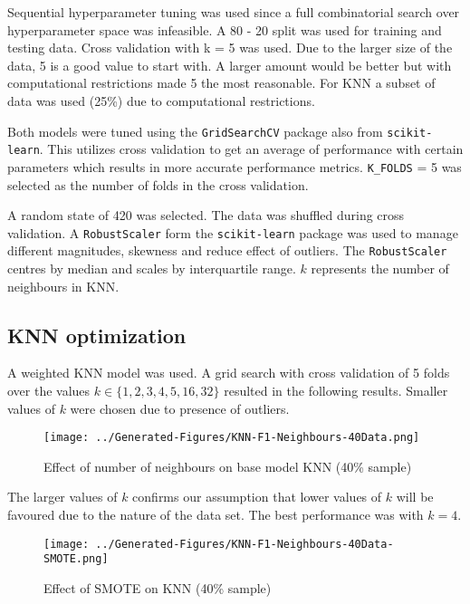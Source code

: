 \documentclass[conference]{IEEEtran}
\begin{document}
Sequential hyperparameter tuning was used since a full combinatorial search over hyperparameter space was infeasible. A 80 - 20 split was used for training and testing data. Cross validation with k = 5 was used. Due to the larger size of the data, 5 is a good value to start with. A larger amount would be better but with computational restrictions made 5 the most reasonable. For KNN a subset of data was used (25\%) due to computational restrictions.

Both models were tuned using the \texttt{GridSearchCV} package also from \texttt{scikit-learn}. This utilizes cross validation to get an average of performance with certain parameters which results in more accurate performance metrics. \texttt{K\_FOLDS} = 5 was selected as the number of folds in the cross validation. 

A random state of 420 was selected. The data was shuffled during cross validation. A \texttt{RobustScaler} form the \texttt{scikit-learn} package was used to manage different magnitudes, skewness and reduce effect of outliers. The \texttt{RobustScaler} centres by median and scales by interquartile range. $k$ represents the number of neighbours in KNN.
\subsection{KNN optimization}
A weighted KNN model was used. A grid search with cross validation of 5 folds over the values $k \in \{1, 2, 3, 4, 5, 16, 32\}$ resulted in the following results. Smaller values of $k$ were chosen due to presence of outliers. 
\begin{figure}[H]
	\centering
	\begin{minipage}{0.45\textwidth}
		\centering
		\texttt{[image: ../Generated-Figures/KNN-F1-Neighbours-40Data.png]}
		\caption{Effect of number of neighbours on base model KNN (40\% sample)}
		\label{fig:neighbours}
	\end{minipage}
\end{figure}

The larger values of $k$ confirms our assumption that lower values of $k$ will be favoured due to the nature of the data set. The best performance was with $k=4$.

\begin{figure}[H]
	\centering
	\begin{minipage}{0.45\textwidth}
		\centering
		\texttt{[image: ../Generated-Figures/KNN-F1-Neighbours-40Data-SMOTE.png]}
		\caption{Effect of SMOTE on KNN (40\% sample)}
		\label{fig:smote}
	\end{minipage}
\end{figure}
\end{document}
